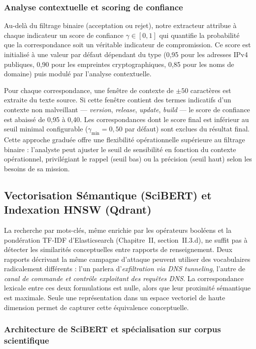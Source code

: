 \subsubsection{Analyse contextuelle et scoring de confiance}

Au-delà du filtrage binaire (acceptation ou rejet), notre extracteur attribue à chaque indicateur un score de confiance $\gamma \in [0, 1]$ qui quantifie la probabilité que la correspondance soit un véritable indicateur de compromission. Ce score est initialisé à une valeur par défaut dépendant du type (0{,}95 pour les adresses IPv4 publiques, 0{,}90 pour les empreintes cryptographiques, 0{,}85 pour les noms de domaine) puis modulé par l'analyse contextuelle.

Pour chaque correspondance, une fenêtre de contexte de $\pm 50$ caractères est extraite du texte source. Si cette fenêtre contient des termes indicatifs d'un contexte non malveillant --- \textit{version}, \textit{release}, \textit{update}, \textit{build} --- le score de confiance est abaissé de 0{,}95 à 0{,}40. Les correspondances dont le score final est inférieur au seuil minimal configurable ($\gamma_{\min} = 0{,}50$ par défaut) sont exclues du résultat final. Cette approche graduée offre une flexibilité opérationnelle supérieure au filtrage binaire : l'analyste peut ajuster le seuil de sensibilité en fonction du contexte opérationnel, privilégiant le rappel (seuil bas) ou la précision (seuil haut) selon les besoins de sa mission.

\subsection{Vectorisation Sémantique (SciBERT) et Indexation HNSW (Qdrant)}

La recherche par mots-clés, même enrichie par les opérateurs booléens et la pondération TF-IDF d'Elasticsearch (Chapitre~II, section~II.3.d), ne suffit pas à détecter les similarités conceptuelles entre rapports de renseignement. Deux rapports décrivant la même campagne d'attaque peuvent utiliser des vocabulaires radicalement différents : l'un parlera d'\textit{exfiltration via DNS tunneling}, l'autre de \textit{canal de commande et contrôle exploitant des requêtes DNS}. La correspondance lexicale entre ces deux formulations est nulle, alors que leur proximité sémantique est maximale. Seule une représentation dans un espace vectoriel de haute dimension permet de capturer cette équivalence conceptuelle.

\subsubsection{Architecture de SciBERT et spécialisation sur corpus scientifique}

